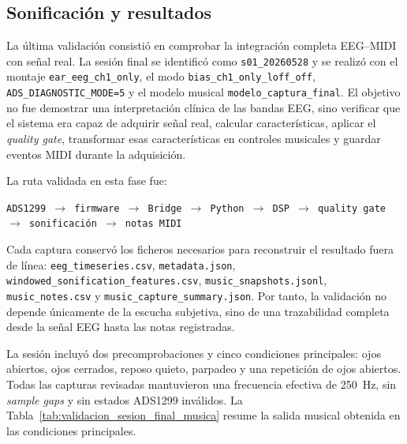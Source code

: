 \subsection{Sonificación y resultados}
\label{subsec:validacion_sonificacion_resultados}

La última validación consistió en comprobar la integración completa EEG--MIDI con señal real. La sesión final se identificó como \texttt{s01\_20260528} y se realizó con el montaje \texttt{ear\_eeg\_ch1\_only}, el modo \texttt{bias\_ch1\_only\_loff\_off}, \texttt{ADS\_DIAGNOSTIC\_MODE=5} y el modelo musical \texttt{modelo\_captura\_final}. El objetivo no fue demostrar una interpretación clínica de las bandas EEG, sino verificar que el sistema era capaz de adquirir señal real, calcular características, aplicar el \textit{quality gate}, transformar esas características en controles musicales y guardar eventos MIDI durante la adquisición.

La ruta validada en esta fase fue:

\begin{center}
\texttt{ADS1299 $\rightarrow$ firmware $\rightarrow$ Bridge $\rightarrow$ Python $\rightarrow$ DSP $\rightarrow$ quality gate $\rightarrow$ sonificación $\rightarrow$ notas MIDI}
\end{center}

Cada captura conservó los ficheros necesarios para reconstruir el resultado fuera de línea: \texttt{eeg\_timeseries.csv}, \texttt{metadata.json}, \texttt{windowed\_sonification\_features.csv}, \texttt{music\_snapshots.jsonl}, \texttt{music\_notes.csv} y \texttt{music\_capture\_summary.json}. Por tanto, la validación no depende únicamente de la escucha subjetiva, sino de una trazabilidad completa desde la señal EEG hasta las notas registradas.

La sesión incluyó dos precomprobaciones y cinco condiciones principales: ojos abiertos, ojos cerrados, reposo quieto, parpadeo y una repetición de ojos abiertos. Todas las capturas revisadas mantuvieron una frecuencia efectiva de \SI{250}{\hertz}, sin \textit{sample gaps} y sin estados ADS1299 inválidos. La Tabla~\ref{tab:validacion_sesion_final_musica} resume la salida musical obtenida en las condiciones principales.

